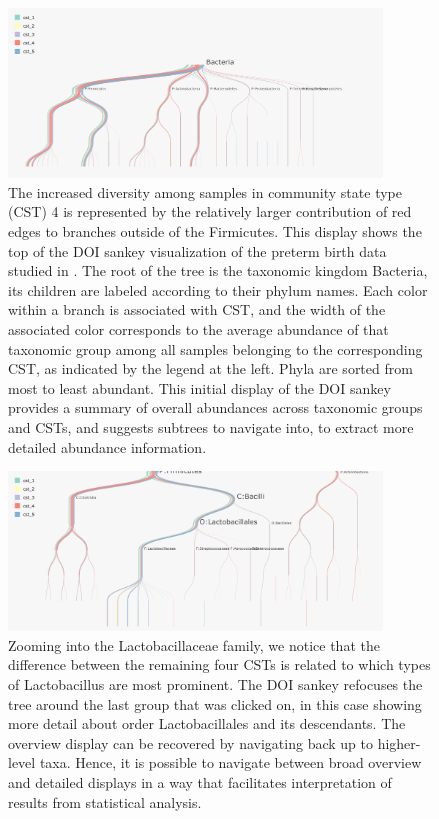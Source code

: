\documentclass[12pt]{article}
\begin{document}
\begin{figure}

{\centering \includegraphics[width=375px]{figure/preterm_csts}

}

\caption{The increased diversity among samples in community state type (CST) 4
  is represented by the relatively larger contribution of red edges to branches
  outside of the Firmicutes. This display shows the top of the DOI sankey
  visualization of the preterm birth data studied in
  \citep{digiulio2015temporal}. The root of the tree is the taxonomic kingdom
  Bacteria, its children are labeled according to their phylum names. Each color
  within a branch is associated with CST, and the width of the associated color
  corresponds to the average abundance of that taxonomic group among all samples
  belonging to the corresponding CST, as indicated by the legend at the left.
  Phyla are sorted from most to least abundant. This initial display of the DOI
  sankey provides a summary of overall abundances across taxonomic groups and
  CSTs, and suggests subtrees to navigate into, to extract more detailed
  abundance information.
}\label{fig:pretermcsts}
\end{figure}

\begin{figure}

{\centering \includegraphics[width=375px]{figure/preterm_csts_lacto}

}

\caption{Zooming into the Lactobacillaceae family, we notice that the difference
  between the remaining four CSTs is related to which types of Lactobacillus are
  most prominent. The DOI sankey refocuses the tree around the last group that
  was clicked on, in this case showing more detail about order Lactobacillales
  and its descendants. The overview display can be recovered by navigating back
  up to higher-level taxa. Hence, it is possible to navigate between broad
  overview and detailed displays in a way that facilitates interpretation of
  results from statistical analysis.}\label{fig:pretermcstslacto}
\end{figure}
\end{document}
